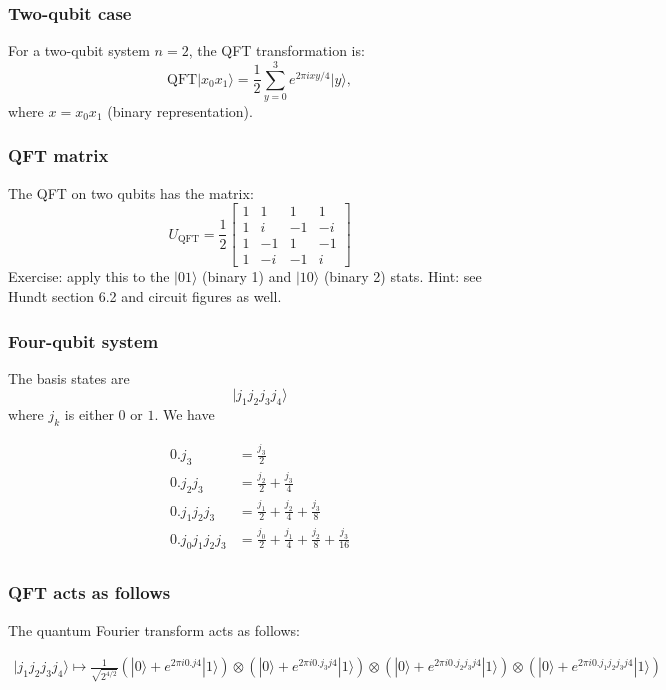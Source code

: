 \documentclass{beamer}
\begin{document}
\begin{frame}
\frametitle{Two-qubit case}

For a two-qubit system $n=2$, the QFT transformation is:
\[
\text{QFT} \vert x_0 x_1\rangle = \frac{1}{2} \sum_{y=0}^{3} e^{2\pi i x y / 4} \vert y\rangle, 
\]
where $x = x_0 x_1$ (binary representation).
\end{frame}

\begin{frame}
\frametitle{QFT matrix}

The QFT on two qubits has the matrix:
\[
   U_{\text{QFT}} = \frac{1}{2}
   \begin{bmatrix}
       1 & 1 & 1 & 1 \\
       1 & i & -1 & -i \\
       1 & -1 & 1 & -1 \\
       1 & -i & -1 & i
   \end{bmatrix}
\]
Exercise: apply this to the $\vert 01\rangle$ (binary 1) and $\vert 10\rangle$ (binary 2) stats.
Hint: see Hundt section 6.2 and circuit figures as well.
\end{frame}

\begin{frame}
\frametitle{Four-qubit system}

The basis states are
\[
|j_1j_2j_3j_4 \rangle
\]
where \(j_k\) is either \(0\) or \(1\). We have

\begin{align*}
0.j_3 &= \frac{j_3}{2} \\
0.j_2j_3 &= \frac{j_2}{2} + \frac{j_3}{4} \\
0.j_1j_2j_3 &= \frac{j_1}{2} + \frac{j_2}{4} + \frac{j_3}{8} \\
0.j_0j_1j_2j_3 &= \frac{j_0}{2} + \frac{j_1}{4} + \frac{j_2}{8} + \frac{j_3}{16} \\
\end{align*}
\end{frame}

\begin{frame}
\frametitle{QFT acts as follows}

The quantum Fourier transform acts as follows:

\begin{align*}
|j_1j_2j_3j_4 \rangle \mapsto \frac{1}{\sqrt{2^{4/2}}}
\left(|0\rangle + e^{2 \pi i 0.j4}|1\rangle \right) \otimes 
\left(|0\rangle + e^{2 \pi i 0.j_3j4}|1\rangle \right) \otimes 
\left(|0\rangle + e^{2 \pi i 0.j_2j_3j4}|1\rangle \right) \otimes 
\left(|0\rangle + e^{2 \pi i 0.j_1j_2j_3j4}|1\rangle \right) 
\end{align*}
\end{frame}
\end{document}
